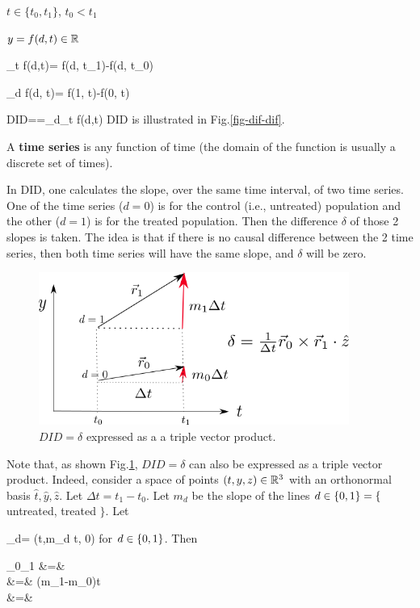 $t\in \{t_0, t_1\}$, $t_0< t_1$

$y=f(d,t)\in { \mathbb{R}}$

\beq
\Delta_t f(d,t)= f(d, t_1)-f(d, t_0)
\eeq

\beq
\Delta_d f(d, t)= f(1, t)-f(0, t)
\eeq

\beq
DID=\delta=\Delta_d\Delta_t f(d,t)
\eeq
DID is illustrated in
 Fig.\ref{fig-dif-dif}. 


A {\bf time series} 
is  any function of time
(the domain of the function
is usually a discrete set of times).


In DID, one calculates the slope,
over the same
time interval,
of two time series. One
of the time series ($d=0$)
is for
the control (i.e., untreated) population
and the other ($d=1$) is
 for the treated population.
Then the 
difference $\delta$ of those 2 slopes is taken.
The idea is that if there is no causal difference
between the 2 time series,
then both time
series will 
have the same slope, and
$\delta$ will be zero.

\begin{figure}[h!]
\centering
\includegraphics[width=4in]
{did/did-3-prod}
\caption{$DID=\delta$ expressed as a 
a triple vector product.} 
\label{fig-did-3-prod}
\end{figure}

Note that,
as shown Fig.\ref{fig-did-3-prod},
$DID=\delta$ can also be expressed
as a triple vector product. Indeed,
consider a space
of points $(t, y, z)\in{ \mathbb{R}}^3$ with
an orthonormal basis
$\hat{t}, \hat{y}, \hat{z}$.
Let $\Delta t = t_1-t_0$.
Let $m_d$ be the slope
of the lines $d\in\{0,1\}=
\{$ untreated, treated $\}$. Let

\beq
{}_d=
(\Delta t,m_d  \Delta t, 0)
\eeq
for $d\in\{0,1\}$.
 Then
 
\beqa
{}
_0\times {}_1\cdot {}
&=&
\det
{}
\\
&=&
(m_1-m_0)\Delta t 
\\
&=& \delta
\eeqa


